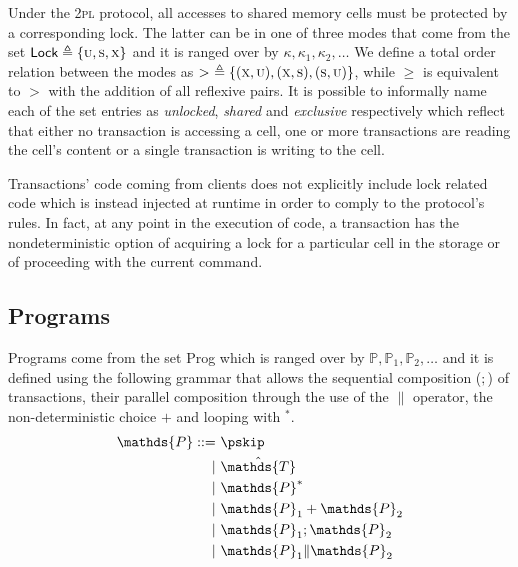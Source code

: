 Under the \textsc{2pl} protocol, all accesses to shared memory cells must be protected by a corresponding lock. The latter can be in one of three modes that come from the set $\mathsf{Lock} \triangleq \{ \textsc{u}, \textsc{s}, \textsc{x} \}$ and it is ranged over by $\kappa, \kappa_1, \kappa_2, \ldots$ We define a total order relation between the modes as $>\ \triangleq \{ (\textsc{x}, \textsc{u}), (\textsc{x}, \textsc{s}), (\textsc{s}, \textsc{u}) \}$, while $\geq$ is equivalent to $>$ with the addition of all reflexive pairs. It is possible to informally name each of the set entries as \textit{unlocked}, \textit{shared} and \textit{exclusive} respectively which reflect that either no transaction is accessing a cell, one or more transactions are reading the cell's content or a single transaction is writing to the cell.

Transactions' code coming from clients does not explicitly include lock related code which is instead injected at runtime in order to comply to the protocol's rules. In fact, at any point in the execution of code, a transaction has the nondeterministic option of acquiring a lock for a particular cell in the storage or of proceeding with the current command.

\subsection{Programs}

Programs come from the set \textsf{Prog} which is ranged over by $\mathds{P}, \mathds{P}_1, \mathds{P}_2, \ldots$ and it is defined using the following grammar that allows the sequential composition ($;$) of transactions, their parallel composition through the use of the $\|$ operator, the non-deterministic choice $+$ and looping with $^*$.
\begin{align*}
\mathds{P} ::=&
\ \pskip \\
|&\ \hat{\mathds{T}} \\
|&\ \mathds{P}^* \\
|&\ \mathds{P}_1 + \mathds{P}_2 \\
|&\ \mathds{P}_1; \mathds{P}_2 \\
|&\ \mathds{P}_1 \| \mathds{P}_2
\end{align*}

